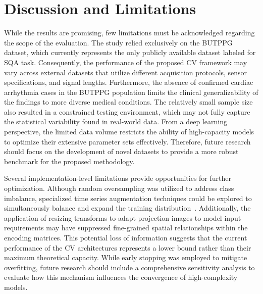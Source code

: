 \documentclass[final,3p,times,twocolumn]{elsarticle}
\begin{document}
\section{Discussion and Limitations}
\label{sec:Limitations}


While the results are promising, few limitations must be acknowledged regarding the scope of the evaluation.
The study relied exclusively on the \gls{BUTPPG} dataset, which currently represents the only publicly available dataset labeled for \gls{SQA} task.
Consequently, the performance of the proposed \gls{CV} framework may vary across external datasets that utilize different acquisition protocols, sensor specifications, and signal lengths.
Furthermore, the absence of confirmed cardiac arrhythmia cases in the \gls{BUTPPG} population limits the clinical generalizability of the findings to more diverse medical conditions.
The relatively small sample size also resulted in a constrained testing environment, which may not fully capture the statistical variability found in real-world data.
From a deep learning perspective, the limited data volume restricts the ability of high-capacity models to optimize their extensive parameter sets effectively.
Therefore, future research should focus on the development of novel datasets to provide a more robust benchmark for the proposed methodology.




Several implementation-level limitations provide opportunities for further optimization.
Although random oversampling was utilized to address class imbalance, specialized time series augmentation techniques could be explored to simultaneously balance and expand the training distribution~\cite{TimeSeriesAugmentation}.
Additionally, the application of resizing transforms to adapt projection images to model input requirements may have suppressed fine-grained spatial relationships within the encoding matrices.
This potential loss of information suggests that the current performance of the \gls{CV} architectures represents a lower bound rather than their maximum theoretical capacity.
While early stopping was employed to mitigate overfitting, future research should include a comprehensive sensitivity analysis to evaluate how this mechanism influences the convergence of high-complexity models.
\end{document}
